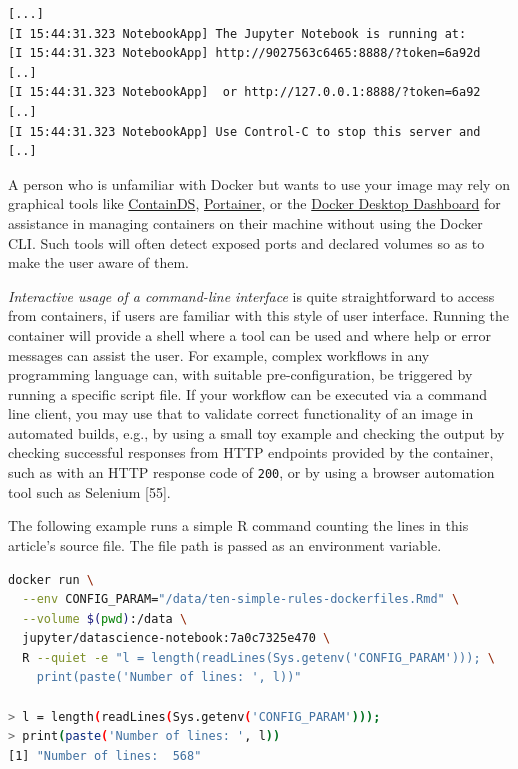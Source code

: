 \documentclass[10pt,letterpaper]{article}
\begin{document}
\begin{verbatim}
[...]
[I 15:44:31.323 NotebookApp] The Jupyter Notebook is running at:
[I 15:44:31.323 NotebookApp] http://9027563c6465:8888/?token=6a92d [..]
[I 15:44:31.323 NotebookApp]  or http://127.0.0.1:8888/?token=6a92 [..]
[I 15:44:31.323 NotebookApp] Use Control-C to stop this server and [..]
\end{verbatim}

\normalsize

A person who is unfamiliar with Docker but wants to use your image may
rely on graphical tools like \href{https://containds.com/}{ContainDS},
\href{https://www.portainer.io/}{Portainer}, or the
\href{https://docs.docker.com/desktop/dashboard/}{Docker Desktop
Dashboard} for assistance in managing containers on their machine
without using the Docker CLI. Such tools will often detect exposed ports
and declared volumes so as to make the user aware of them.

\emph{Interactive usage of a command-line interface} is quite
straightforward to access from containers, if users are familiar with
this style of user interface. Running the container will provide a shell
where a tool can be used and where help or error messages can assist the
user. For example, complex workflows in any programming language can,
with suitable pre-configuration, be triggered by running a specific
script file. If your workflow can be executed via a command line client,
you may use that to validate correct functionality of an image in
automated builds, e.g., by using a small toy example and checking the
output by checking successful responses from HTTP endpoints provided by
the container, such as with an HTTP response code of \texttt{200}, or by
using a browser automation tool such as Selenium {[}55{]}.

The following example runs a simple R command counting the lines in this
article's source file. The file path is passed as an environment
variable.

\footnotesize

\begin{minipage}{\linewidth}

\begin{lstlisting}[language=bash,caption={Passing a parameter via environment variable; working code in example `pass-parameter-env`, see \nameref{examples}.},breaklines=true,label={lst:passparam}]
docker run \
  --env CONFIG_PARAM="/data/ten-simple-rules-dockerfiles.Rmd" \
  --volume $(pwd):/data \
  jupyter/datascience-notebook:7a0c7325e470 \
  R --quiet -e "l = length(readLines(Sys.getenv('CONFIG_PARAM'))); \
    print(paste('Number of lines: ', l))"

> l = length(readLines(Sys.getenv('CONFIG_PARAM')));
> print(paste('Number of lines: ', l))
[1] "Number of lines:  568"

\end{lstlisting}

\end{minipage}
\end{document}

